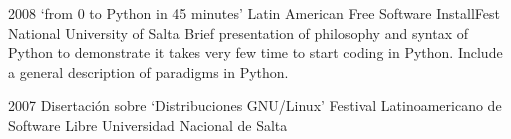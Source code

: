 \documentclass[11pt,a4paper]{moderncv}
\begin{document}
\cventry                                                                         %
    {2008}                                                                       %
    {`from 0 to Python in 45 minutes'}                                           %
    {Latin American Free Software InstallFest}                                   %
    {National University of Salta}                                               %
    {}                                                                           %
    {                                                                            %
        Brief presentation of philosophy and syntax of Python                    %
        to demonstrate it takes very few time to start                           %
        coding in Python.                                                        %
        Include a general description of paradigms in Python.                    %
    }                                                                            %

\cventry                                                                         %
    {2007}                                                                       %
    {Disertación sobre `Distribuciones GNU/Linux'}                               %
    {Festival Latinoamericano de Software Libre}                                 %
    {Universidad Nacional de Salta}                                              %
    {}                                                                           %
    {}                                                                           %
\end{document}
